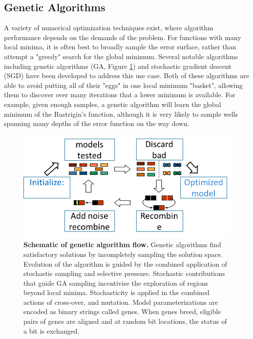 \subsection{Genetic Algorithms}
A variety of numerical optimization techniques exist, where algorithm performance depends on the demands of the problem.
For functions with many local minima, it is often best to broadly sample the error surface, rather than attempt a "greedy" search for the global minimum.
Several notable algorithms including genetic algorithms (GA, Figure \ref{fig:GeneticAlgOver}) and stochastic gradient descent (SGD) have been developed to address this use case.
Both of these algorithms are able to avoid putting all of their "eggs" in one local minimum "basket", allowing them to discover over many iterations that a lower minimum is available.
For example, given enough samples, a genetic algorithm will learn the global minimum of the Rastrigin's function, although it is very likely to sample wells spanning many depths of the error function on the way down.

\begin{figure}
\begin{center}

    \includegraphics[width=0.7\linewidth]{figures/How_Genetic_Alg_Works.png}
  \caption{\textbf{Schematic of genetic algorithm flow.} Genetic algorithms find satisfactory solutions by incompletely sampling the solution space. Evolution of the algorithm is guided by the combined application of stochastic sampling and selective pressure. Stochastic contributions that guide GA sampling incentivise the exploration of regions beyond local minima. Stochasticity is applied in the combined actions of cross-over, and mutation. Model parameterizations are encoded as binary strings called genes. When genes breed, eligible pairs of genes are aligned and at random bit locations, the status of a bit is exchanged.  
}
  \label{fig:GeneticAlgOver}
\end{center}

\end{figure}
  
